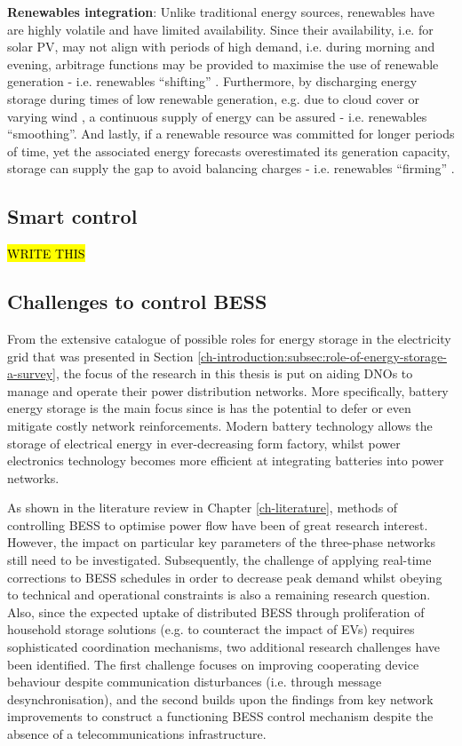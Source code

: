 \textbf{Renewables integration}: Unlike traditional energy sources, renewables have are highly volatile and have limited availability.
Since their availability, i.e. for solar PV, may not align with periods of high demand, i.e. during morning and evening, arbitrage functions may be provided to maximise the use of renewable generation - i.e. renewables ``shifting'' \cite{Zakeri2015}.
Furthermore, by discharging energy storage during times of low renewable generation, e.g. due to cloud cover or varying wind \cite{Jewell1987}, a continuous supply of energy can be assured - i.e. renewables ``smoothing''.
And lastly, if a renewable resource was committed for longer periods of time, yet the associated energy forecasts overestimated its generation capacity, storage can supply the gap to avoid balancing charges - i.e. renewables ``firming'' \cite{Chakraborty2012}.

\subsection{Smart control}
\label{ch-introduction:subsec:smart-control}

\hl{WRITE THIS}

\subsection{Challenges to control BESS}
\label{ch-introduction:subsec:motivation}

From the extensive catalogue of possible roles for energy storage in the electricity grid that was presented in Section \ref{ch-introduction:subsec:role-of-energy-storage-a-survey}, the focus of the research in this thesis is put on aiding DNOs to manage and operate their power distribution networks.
More specifically, battery energy storage is the main focus since is has the potential to defer or even mitigate costly network reinforcements.
Modern battery technology allows the storage of electrical energy in ever-decreasing form factory, whilst power electronics technology becomes more efficient at integrating batteries into power networks.

As shown in the literature review in Chapter \ref{ch-literature}, methods of controlling BESS to optimise power flow have been of great research interest.
However, the impact on particular key parameters of the three-phase networks still need to be investigated.
Subsequently, the challenge of applying real-time corrections to BESS schedules in order to decrease peak demand whilst obeying to technical and operational constraints is also a remaining research question.
Also, since the expected uptake of distributed BESS through proliferation of household storage solutions (e.g. to counteract the impact of EVs) requires sophisticated coordination mechanisms, two additional research challenges have been identified.
The first challenge focuses on improving cooperating device behaviour despite communication disturbances (i.e. through message desynchronisation), and the second builds upon the findings from key network improvements to construct a functioning BESS control mechanism despite the absence of a telecommunications infrastructure.






